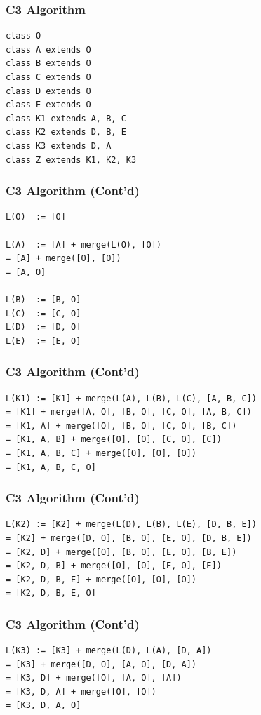 \documentclass{../py-lecture}
\begin{document}
\begin{frame}[fragile]
	\frametitle{C3 Algorithm}
	\begin{verbatim}
class O
class A extends O
class B extends O
class C extends O
class D extends O
class E extends O
class K1 extends A, B, C
class K2 extends D, B, E
class K3 extends D, A
class Z extends K1, K2, K3
	\end{verbatim}
\end{frame}

\begin{frame}[fragile]
	\frametitle{C3 Algorithm (Cont'd)}
	\begin{verbatim}
L(O)  := [O]

L(A)  := [A] + merge(L(O), [O])
= [A] + merge([O], [O])
= [A, O]

L(B)  := [B, O]
L(C)  := [C, O]
L(D)  := [D, O]
L(E)  := [E, O]
	\end{verbatim}
\end{frame}

\begin{frame}[fragile]
	\frametitle{C3 Algorithm (Cont'd)}
	\begin{verbatim}
L(K1) := [K1] + merge(L(A), L(B), L(C), [A, B, C])
= [K1] + merge([A, O], [B, O], [C, O], [A, B, C])
= [K1, A] + merge([O], [B, O], [C, O], [B, C])
= [K1, A, B] + merge([O], [O], [C, O], [C])
= [K1, A, B, C] + merge([O], [O], [O])
= [K1, A, B, C, O]
	\end{verbatim}
\end{frame}

\begin{frame}[fragile]
	\frametitle{C3 Algorithm (Cont'd)}
	\begin{verbatim}
L(K2) := [K2] + merge(L(D), L(B), L(E), [D, B, E])
= [K2] + merge([D, O], [B, O], [E, O], [D, B, E])
= [K2, D] + merge([O], [B, O], [E, O], [B, E])
= [K2, D, B] + merge([O], [O], [E, O], [E])
= [K2, D, B, E] + merge([O], [O], [O])
= [K2, D, B, E, O]
	\end{verbatim}
\end{frame}

\begin{frame}[fragile]
	\frametitle{C3 Algorithm (Cont'd)}
	\begin{verbatim}
L(K3) := [K3] + merge(L(D), L(A), [D, A])
= [K3] + merge([D, O], [A, O], [D, A])
= [K3, D] + merge([O], [A, O], [A])
= [K3, D, A] + merge([O], [O])
= [K3, D, A, O]
  \end{verbatim}
\end{frame}
\end{document}
